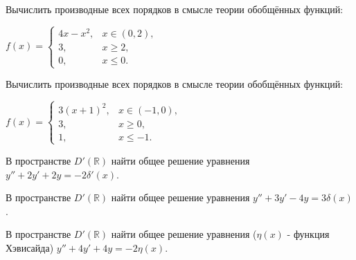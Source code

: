\begin{cond}
	Вычислить производные всех порядков в смысле теории обобщённых функций:

	\(
	f(x) =
	\begin{cases}
		4x - x^2, & x \in (0,2), \\
		3,        & x \ge 2,     \\
		0,        & x \le 0.
	\end{cases}
	\)
\end{cond}

\begin{cond}
	Вычислить производные всех порядков в смысле теории обобщённых функций:

	\(
	f(x) =
	\begin{cases}
		3(x+1)^2, & x \in (-1,0), \\
		3,        & x \ge 0,      \\
		1,        & x \le -1.
	\end{cases}
	\)
\end{cond}


































\begin{cond}
	В пространстве \(D'(\mathbb{R})\) найти общее решение уравнения
	$y'' + 2y' + 2y = -2\delta'(x)$.
\end{cond}

\begin{cond}
	В пространстве \(D'(\mathbb{R})\) найти общее решение уравнения
	$y'' + 3y' - 4y = 3\delta(x)$.
\end{cond}

\begin{cond}
	В пространстве \(D'(\mathbb{R})\) найти общее решение уравнения
	($\eta(x)$ - функция Хэвисайда)
	$y'' + 4y' + 4y = -2\eta(x)$.
\end{cond}

